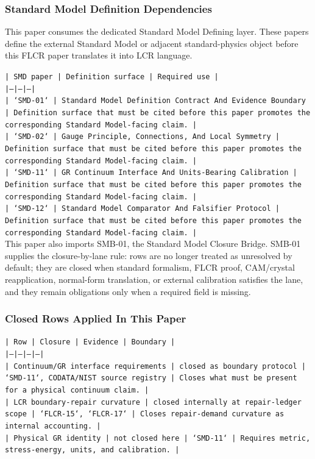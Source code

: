 \documentclass[11pt]{article}
\begin{document}
\subsubsection*{Standard Model Definition Dependencies}

This paper consumes the dedicated Standard Model Defining layer. These papers define the external Standard Model or adjacent standard-physics object before this FLCR paper translates it into LCR language.

\noindent\texttt{| SMD paper | Definition surface | Required use |}\\
\noindent\texttt{|---|---|---|}\\
\noindent\texttt{| `SMD-01` | Standard Model Definition Contract And Evidence Boundary | Definition surface that must be cited before this paper promotes the corresponding Standard Model-facing claim. |}\\
\noindent\texttt{| `SMD-02` | Gauge Principle, Connections, And Local Symmetry | Definition surface that must be cited before this paper promotes the corresponding Standard Model-facing claim. |}\\
\noindent\texttt{| `SMD-11` | GR Continuum Interface And Units-Bearing Calibration | Definition surface that must be cited before this paper promotes the corresponding Standard Model-facing claim. |}\\
\noindent\texttt{| `SMD-12` | Standard Model Comparator And Falsifier Protocol | Definition surface that must be cited before this paper promotes the corresponding Standard Model-facing claim. |}\\

This paper also imports SMB-01, the Standard Model Closure Bridge. SMB-01 supplies the closure-by-lane rule: rows are no longer treated as unresolved by default; they are closed when standard formalism, FLCR proof, CAM/crystal reapplication, normal-form translation, or external calibration satisfies the lane, and they remain obligations only when a required field is missing.

\subsubsection*{Closed Rows Applied In This Paper}

\noindent\texttt{| Row | Closure | Evidence | Boundary |}\\
\noindent\texttt{|---|---|---|---|}\\
\noindent\texttt{| Continuum/GR interface requirements | closed as boundary protocol | `SMD-11`, CODATA/NIST source registry | Closes what must be present for a physical continuum claim. |}\\
\noindent\texttt{| LCR boundary-repair curvature | closed internally at repair-ledger scope | `FLCR-15`, `FLCR-17` | Closes repair-demand curvature as internal accounting. |}\\
\noindent\texttt{| Physical GR identity | not closed here | `SMD-11` | Requires metric, stress-energy, units, and calibration. |}\\
\end{document}
